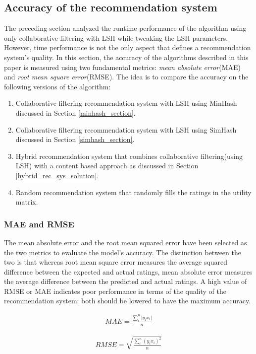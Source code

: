 \subsection{Accuracy of the recommendation system}
\label{accuracy_of_rec_sys}
The preceding section analyzed the runtime performance of the algorithm using only collaborative filtering with LSH while tweaking the LSH parameters. However, time performance is not the only aspect that defines a recommendation system's quality. In this section, the accuracy of the algorithms described in this paper is measured using two fundamental metrics: \emph{mean absolute error}(MAE) and \emph{root mean square error}(RMSE). The idea is to compare the accuracy on the following versions of the algorithm:
\begin{enumerate}
    \item Collaborative filtering recommendation system with LSH using MinHash discussed in Section \ref{minhash_section}. 
    \item Collaborative filtering recommendation system with LSH using SimHash discussed in Section \ref{simhash_section}. 
    \item Hybrid recommendation system that combines collaborative filtering(using LSH) with a content based approach as discussed in Section \ref{hybrid_rec_sys_solution}.
    \item Random recommendation system that randomly fills the ratings in the utility matrix.
\end{enumerate}

\subsubsection{MAE and RMSE} The mean absolute error and the root mean squared error have been selected as the two metrics to evaluate the model's accuracy. The distinction between the two is that whereas root mean square error measures the average squared difference between the expected and actual ratings, mean absolute error measures the average difference between the predicted and actual ratings. A high value of RMSE or MAE indicates poor performance in terms of the quality of the recommendation system: both should be lowered to have the maximum accuracy. 

\begin{minipage}{0.49\linewidth}
    \centering
    \begin{equation}
    \label{rmse}
    \begin{aligned}
        MAE = \frac{\sum_i^n \lvert y_i  x_i \lvert }{n}
    \end{aligned}
    \end{equation}
\end{minipage}
\begin{minipage}{0.49\linewidth}
    \centering
    \begin{equation}
    \label{rmse}
    \begin{aligned}
        RMSE = \sqrt{\frac{\sum_i^n (y_i  x_i)^2 }{n}}
    \end{aligned}
    \end{equation}
    
\end{minipage}

